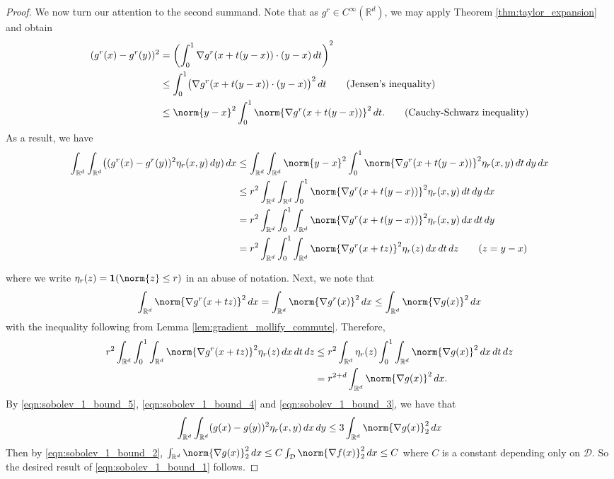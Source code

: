 \documentclass{article}
\newcommand{\Reals}{\mathbb{R}}
\newcommand{\1}{\mathbb{I}}
\newcommand{\D}{\mathcal{D}}
\newcommand{\Rd}{\Reals^d}
\theoremstyle{alden}
\theoremstyle{aldenthm}
\theoremstyle{definition}
\theoremstyle{remark}
\begin{document}
\begin{proof}
	We now turn our attention to the second summand. Note that as $g^r \in C^{\infty}(\Rd)$, we may apply Theorem \ref{thm:taylor_expansion} and obtain
	\begin{align*}
	(g^r(x) - g^r(y))^2 & = \left(\int_{0}^{1} \nabla g^r(x + t(y - x)) \cdot (y - x) \,dt\right)^2 \\
	& \leq \int_{0}^{1} \bigl(\nabla g^r(x + t(y - x)) \cdot (y - x)\bigr)^2 \,dt  \tag{Jensen's inequality} \\
	& \leq \norm{y - x}^2 \int_{0}^{1} \norm{\nabla g^r(x + t(y - x))}^2 \,dt. \tag{Cauchy-Schwarz inequality}
	\end{align*}
	As a result, we have
	\begin{align*}
	\int_{\Rd} \int_{\Rd} \bigl((g^r(x) - g^r(y))^2 \eta_r(x,y) \,dy) \,dx & \leq \int_{\Rd} \int_{\Rd} \norm{y - x}^2  \int_{0}^{1} \norm{\nabla g^r(x + t(y - x))}^2 \eta_r(x,y) \,dt \,dy \,dx \\
	& \leq r^{2} \int_{\Rd} \int_{\Rd} \int_{0}^{1} \norm{\nabla g^r(x + t(y - x))}^2 \eta_r(x,y) \,dt \,dy \,dx \\
	& = r^{2} \int_{\Rd} \int_{0}^{1} \int_{\Rd} \norm{\nabla g^r(x + t(y - x))}^2 \eta_r(x,y) \,dx \,dt \,dy \\
	& = r^{2} \int_{\Rd} \int_{0}^{1} \int_{\Rd} \norm{\nabla g^r(x + tz)}^2 \eta_r(z) \,dx \,dt \,dz \tag{$z = y - x$}
	\end{align*}
	
	where we write $\eta_r(z) = \mathbf{1}(\norm{z} \leq r)$ in an abuse of notation. Next, we note that
	\begin{equation*}
	\int_{\Rd} \norm{\nabla g^r(x + tz)}^2 \,dx = \int_{\Rd} \norm{\nabla g^r(x)}^2 \,dx \leq \int_{\Rd} \norm{\nabla g(x)}^2 \,dx
	\end{equation*}
	with the inequality following from Lemma \ref{lem:gradient_mollify_commute}. Therefore,
	\begin{align}
	r^{2} \int_{\Rd} \int_{0}^{1} \int_{\Rd} \norm{\nabla g^r(x + tz)}^2 \eta_r(z) \,dx \,dt \,dz & \leq r^{2} \int_{\Rd} \eta_r(z) \int_{0}^{1} \int_{\Rd} \norm{\nabla g(x)}^2 \,dx  \,dt \,dz \nonumber \\
	& = r^{2 + d} \int_{\Rd} \norm{\nabla g(x)}^2 \,dx. \label{eqn:sobolev_1_bound_3}
	\end{align}
	By \eqref{eqn:sobolev_1_bound_5}, \eqref{eqn:sobolev_1_bound_4} and \eqref{eqn:sobolev_1_bound_3}, we have that 
	\begin{equation*}
	\int_{\Rd} \int_{\Rd} (g(x) - g(y))^2 \eta_r(x,y) \,dx \,dy \leq 3 \int_{\Rd} \norm{\nabla g(x)}_2^2 \,dx
	\end{equation*}
	Then by \eqref{eqn:sobolev_1_bound_2}, $\int_{\Rd} \norm{\nabla g(x)}_2^2 \,dx \leq C\int_{\D} \norm{\nabla f(x)}_2^2 \,dx \leq C$ where $C$ is a constant depending only on $\D$. So the desired result of \eqref{eqn:sobolev_1_bound_1} follows.
\end{proof}
\end{document}
